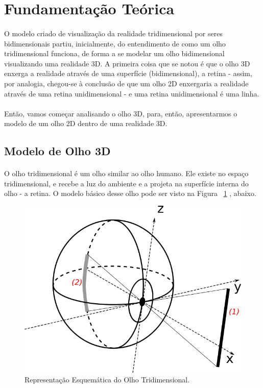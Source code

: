 \documentclass{article}
\begin{document}
	\section{Fundamentação Teórica} \label{ft}
	
	\paragraph{}
	O modelo criado de visualização da realidade tridimensional por seres bidimensionais partiu, inicialmente, do entendimento de como um olho tridimensional funciona, de forma a se modelar um olho bidimensional visualizando uma realidade 3D. A primeira coisa que se notou é que o olho 3D enxerga a realidade através de uma superfície (bidimensional), a retina - assim, por analogia, chegou-se à conclusão de que um olho 2D enxergaria a realidade através de uma retina unidimensional - e uma retina unidimensional é uma linha.
	
	\paragraph{}
	Então, vamos começar analisando o olho 3D, para, então, apresentarmos o modelo de um olho 2D dentro de uma realidade 3D.
	
	\subsection{Modelo de Olho 3D} \label{mo3d}
	\paragraph{}
	O olho tridimensional é um olho similar ao olho humano. Ele existe no espaço tridimensional, e recebe a luz do ambiente e a projeta na superfície interna do olho - a retina. O modelo básico desse olho pode ser visto na Figura ~\ref{fig:Olho3D} , abaixo.
	
	\begin{figure}[h]
		\centering
		\includegraphics[scale=0.5]{Olho-Tridimensional}
		\caption{Representação Esquemática do Olho Tridimensional.}
		\label{fig:Olho3D}
	\end{figure}
\end{document}

